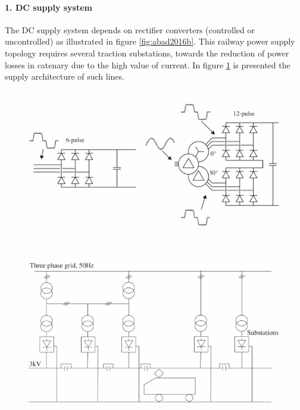 \paragraph{1. DC supply system\\}

The DC supply system depends on rectifier converters (controlled or uncontrolled) as illustrated in figure \ref{fig:abad2016b}. This railway power supply topology requires several traction substations, towards the reduction of power losses in catenary due to the high value of current. In figure \ref{fig:abad2016f} is presented the supply architecture of such lines.


\begin{figure}[h!]
	\centering
	\begin{minipage}{.5\textwidth}
		\centering
		\includegraphics[width=\textwidth,keepaspectratio]{figures/31.PowerS/abad2016b}
		\label{fig:abad2016b}
	\end{minipage}%
	\begin{minipage}{.03\textwidth}  ~\end{minipage}	
	\begin{minipage}{.4\textwidth}
		\centering
		\includegraphics[width=\textwidth,keepaspectratio]{figures/31.PowerS/abad2016f}
		\label{fig:abad2016f}
	\end{minipage}
\end{figure}

